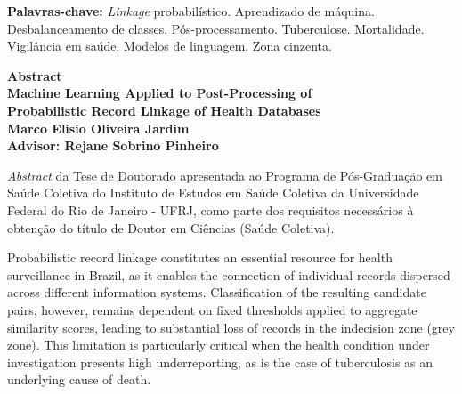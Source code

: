 \documentclass[12pt,a4paper,openany]{book}
\begin{document}
\vspace{15pt}

\textbf{Palavras-chave:} \textit{Linkage} probabilístico. Aprendizado de máquina. Desbalanceamento de classes. Pós-processamento. Tuberculose. Mortalidade. Vigilância em saúde. Modelos de linguagem. Zona cinzenta.





\newpage

\noindent

\vspace*{20pt}
\begin{center}
{\LARGE\bf Abstract}\\
\vspace{15pt}
{\Large\bf Machine Learning Applied to Post-Processing of\\Probabilistic Record Linkage of Health Databases}\\
\vspace{6pt}
{\bf Marco Elisio Oliveira Jardim}\\
\vspace{12pt}
{\bf Advisor: Rejane Sobrino Pinheiro}\\
\vspace{20pt}
\parbox{14cm}{\emph{Abstract} da Tese de Doutorado apresentada ao Programa de Pós-Graduação em Saúde Coletiva do Instituto de Estudos em Saúde Coletiva da Universidade Federal do Rio de Janeiro - UFRJ, como parte dos requisitos necessários à obtenção do título de Doutor em Ciências (Saúde Coletiva).} %
\end{center}
\vspace*{35pt}

Probabilistic record linkage constitutes an essential resource for health surveillance in Brazil, as it enables the connection of individual records dispersed across different information systems.
Classification of the resulting candidate pairs, however, remains dependent on fixed thresholds applied to aggregate similarity scores, leading to substantial loss of records in the indecision zone (grey zone).
This limitation is particularly critical when the health condition under investigation presents high underreporting, as is the case of tuberculosis as an underlying cause of death.
\end{document}
